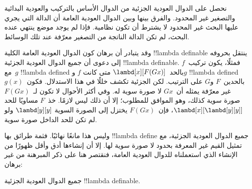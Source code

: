 \documentclass[../../../include/open-logic-section]{subfiles}
\begin{document}

نحصل على الدوال العودية الجزئية من الدوال الأساس بالتركيب والعودية
البدائية والتصغير غير المحدود. والفرق بينها وبين الدوال العودية العامة
أن الدالة التي يجري عليها البحث غير المحدود لا يشترط أن تكون نظامية.
فإذا لم يوجد موضع ينتهي عنده البحث، لم تكن الدالة الناتجة من التصغير
معرّفة عند تلك الوسائط.

وقد يتبادر أن برهان كون الدوال العودية العامة الكلية !!{lambda definable}
ينتقل بحروفه إلى دعوى أن جميع الدوال العودية الجزئية !!{lambda definable}.
فمثلًا، يكون تركيب~$f$ مع~$g$ !!{lambda defined} بالحد~$\lambd[x][F (G x)]$ متى كانت
$f$ و$g$ !!{lambda defined} بالحدين~$F$ و$G$ على الترتيب. لكن الجزئية تكشف
خللًا في هذا الاستدلال. فكون~$g(x)$ غير معرّفة يمثله أن~$G x$ لا
صورة سوية له. وفي أكثر الأحوال لا تكون لـ~$F (G x)$ صورة سوية كذلك،
وهو الموافق للمطلوب؛ إلا أن ذلك ليس لازمًا. خذ~$F$ مساويًا للحد
$\lambd[x][\lambd[y][y]]$، فإن~$F (G x)$ يختزل إلى الصورة السوية
$\lambd[y][y]$ ولو لم تكن للحد الداخل صورة سوية.

وليس هذا مانعًا نهائيًا. فثمة طرائق بها !!{lambda define} جميع الدوال
العودية الجزئية، مع تمثيل القيم غير المعرفة بحدود لا صورة سوية لها.
إلا أن إنشاءها أدق وأقل ظهورًا من الإنشاء الذي استعملناه للدوال
العودية العامة، فنقتصر هنا على ذكر المبرهنة من غير برهان:


\begin{thm}
  جميع الدوال العودية الجزئية !!{lambda definable}.
\end{thm}
\end{document}
